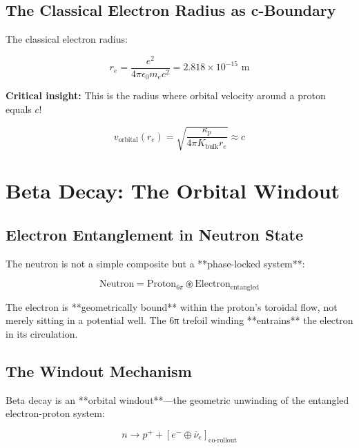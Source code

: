 \subsection{The Classical Electron Radius as c-Boundary}

The classical electron radius:

\begin{equation}
r_e = \frac{e^2}{4\pi\epsilon_0 m_e c^2} = 2.818 \times 10^{-15} \text{ m}
\label{eq:classical_radius}
\end{equation}

\textbf{Critical insight:} This is the radius where orbital velocity around a proton equals $c$!

\begin{equation}
v_{\text{orbital}}(r_e) = \sqrt{\frac{\kappa_p}{4\pi K_{\text{bulk}} r_e}} \approx c
\end{equation}

\section{Beta Decay: The Orbital Windout}

\subsection{Electron Entanglement in Neutron State}

The neutron is not a simple composite but a **phase-locked system**:

\begin{equation}
\text{Neutron} = \text{Proton}_{6\pi} \circledast \text{Electron}_{\text{entangled}}
\end{equation}

The electron is **geometrically bound** within the proton's toroidal flow, not merely sitting in a potential well. The 6π trefoil winding **entrains** the electron in its circulation.

\subsection{The Windout Mechanism}

Beta decay is an **orbital windout**—the geometric unwinding of the entangled electron-proton system:

\begin{equation}
n \to p^+ + [e^- \oplus \bar{\nu}_e]_{\text{co-rollout}}
\end{equation}

